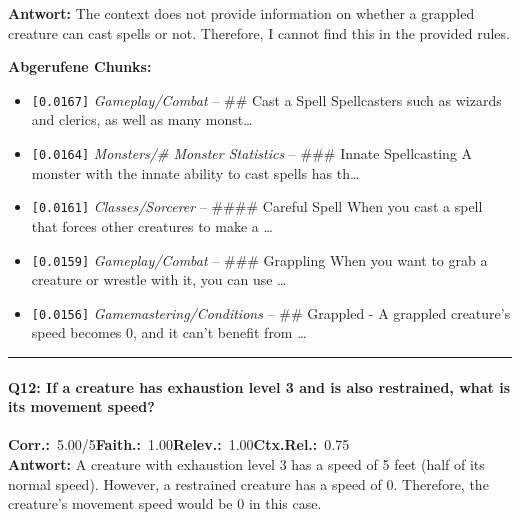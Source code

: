 \noindent\textbf{Antwort:} The context does not provide information on whether a grappled creature can cast spells or not. Therefore, I cannot find this in the provided rules.

\noindent\textbf{Abgerufene Chunks:}
\begin{itemize}[noitemsep, topsep=2pt]
  \item[\textbf{\#1}] \texttt{[0.0167]} \textit{Gameplay/Combat} -- \#\# Cast a Spell  Spellcasters such as wizards and clerics, as well as many monst\ldots
  \item[\textbf{\#2}] \texttt{[0.0164]} \textit{Monsters/# Monster Statistics} -- \#\#\# Innate Spellcasting  A monster with the innate ability to cast spells has th\ldots
  \item[\textbf{\#3}] \texttt{[0.0161]} \textit{Classes/Sorcerer} -- \#\#\#\# Careful Spell  When you cast a spell that forces other creatures to make a \ldots
  \item[\textbf{\#4}] \texttt{[0.0159]} \textit{Gameplay/Combat} -- \#\#\# Grappling  When you want to grab a creature or wrestle with it, you can use \ldots
  \item[\textbf{\#5}] \texttt{[0.0156]} \textit{Gamemastering/Conditions} -- \#\# Grappled  - A grappled creature's speed becomes 0, and it can't benefit from \ldots
\end{itemize}
\vspace{4pt}
\hrule
\vspace{6pt}

\paragraph{Q12: If a creature has exhaustion level 3 and is also restrained, what is its movement speed?}
\noindent \textbf{Corr.:}~5.00/5\quad \textbf{Faith.:}~1.00\quad \textbf{Relev.:}~1.00\quad \textbf{Ctx.Rel.:}~0.75\\

\noindent\textbf{Antwort:} A creature with exhaustion level 3 has a speed of 5 feet (half of its normal speed). However, a restrained creature has a speed of 0. Therefore, the creature's movement speed would be 0 in this case.

